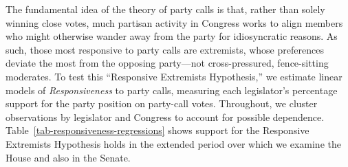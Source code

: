 \documentclass[12pt]{article}
\begin{document}
The fundamental idea of the theory of party calls is that, rather than solely
winning close votes, much partisan activity in Congress works to align members
who might otherwise wander away from the party for idiosyncratic reasons.
As such, those most responsive to party calls are extremists, whose preferences
deviate the most from the opposing party---not cross-pressured, fence-sitting
moderates.
To test this ``Responsive Extremists Hypothesis,'' we estimate linear models of
\textit{Responsiveness} to party calls, measuring each legislator's percentage
support for the party position on party-call votes.
Throughout, we cluster observations by legislator and Congress to account for
possible dependence.
Table~\ref{tab-responsiveness-regressions} shows support for the Responsive
Extremists Hypothesis holds in the extended period over which we examine the
House and also in the Senate.
\end{document}
